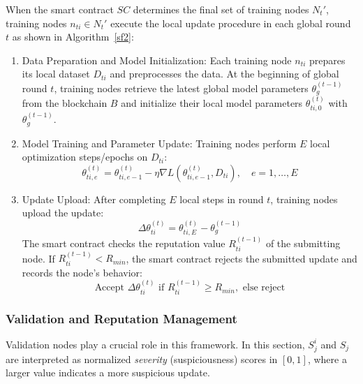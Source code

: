 \documentclass[a4paper]{cas-dc}
\begin{document}
When the smart contract $SC$ determines the final set of training nodes $N_t'$, training nodes $n_{ti} \in N_t'$ execute the local update procedure in each global round $t$ as shown in Algorithm\ \ref{sf2}:
\begin{enumerate}[1)]
	\item Data Preparation and Model Initialization: Each training node $n_{ti}$ prepares its local dataset $D_{ti}$ and preprocesses the data. At the beginning of global round $t$, training nodes retrieve the latest global model parameters $\theta_g^{(t-1)}$ from the blockchain $B$ and initialize their local model parameters $\theta_{ti,0}^{(t)}$ with $\theta_g^{(t-1)}$.
	
	\item Model Training and Parameter Update: Training nodes perform $E$ local optimization steps/epochs on $D_{ti}$:
	\begin{equation}
		\theta_{ti,e}^{(t)} = \theta_{ti,e-1}^{(t)} - \eta \nabla L(\theta_{ti,e-1}^{(t)}, D_{ti}), \quad e=1,\ldots,E
	\end{equation}

	\item Update Upload: After completing $E$ local steps in round $t$, training nodes upload the update:
	\begin{equation}
		\Delta \theta_{ti}^{(t)} = \theta_{ti,E}^{(t)} - \theta_g^{(t-1)}
	\end{equation}
	The smart contract checks the reputation value $R_{ti}^{(t-1)}$ of the submitting node. If $R_{ti}^{(t-1)} < R_{min}$, the smart contract rejects the submitted update and records the node's behavior:
	\begin{equation}
		\text{Accept } \Delta \theta_{ti}^{(t)} \text{ if } R_{ti}^{(t-1)} \geq R_{min}, \text{ else reject}
	\end{equation}
\end{enumerate}



\subsubsection{Validation and Reputation Management}
Validation nodes play a crucial role in this framework. In this section, $S_j^i$ and $S_j$ are interpreted as normalized \emph{severity} (suspiciousness) scores in $[0,1]$, where a larger value indicates a more suspicious update.
\end{document}
